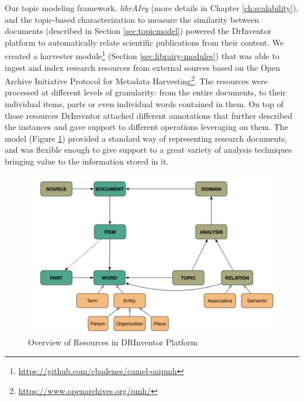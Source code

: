 Our topic modeling framework, \textit{librAIry} (more details in Chapter \ref{ch:scalability}), and the topic-based characterization to measure the similarity between documents (described in Section \ref{sec:topicmodel}) powered the DrInventor platform to automatically relate scientific publications from their content. We created a harvester module\footnote{\url{https://github.com/cbadenes/camel-oaipmh}} (Section \ref{sec:librairy-modules})  that was able to ingest and index research resources from external sources based on the Open Archive Initiative Protocol for Metadata Harvesting\footnote{\url{https://www.openarchives.org/pmh/}}. The resources were processed at different levels of granularity: from the entire documents, to their individual items, parts or even individual words contained in them. On top of those resources DrInventor attached different annotations that further described the instances and gave support to different operations leveraging on them. The model (Figure \ref{fig:drinventor-model}) provided a standard way of representing research documents, and was flexible enough to give support to a great variety of analysis techniques bringing value to the information stored in it. 

\begin{figure}[ht]
    \centering
    \includegraphics[width=0.8\linewidth]{drinventor-model.png}
    \caption{Overview of Resources in DRInventor Platform}
    \label{fig:drinventor-model}
\end{figure}


